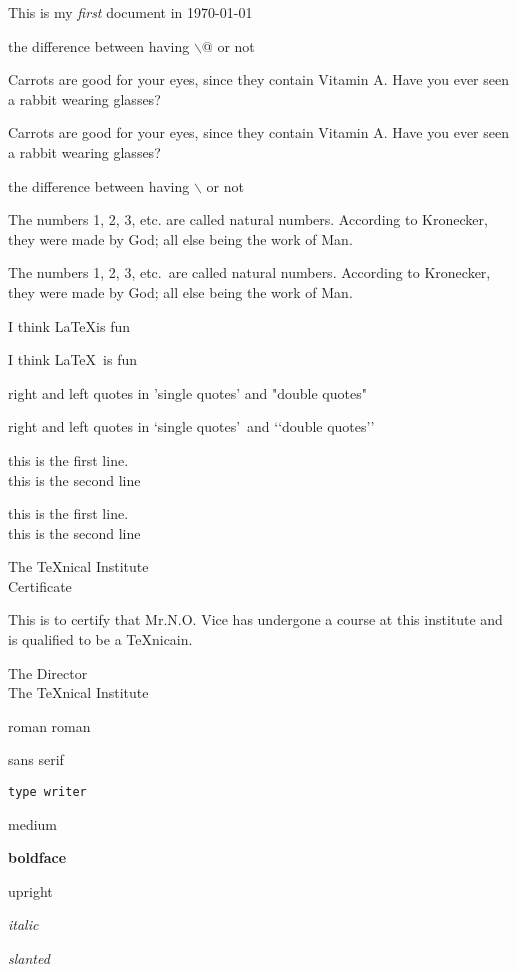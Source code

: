 \documentclass[a4paper, UTF8]{article}
\begin{document}
\noindent This is my \emph{first} document in \today

the difference between having $\backslash$@ or not

Carrots are good for your eyes, since they contain Vitamin A. Have you ever seen a rabbit wearing glasses?

Carrots are good for your eyes, since they contain Vitamin A\@. Have you ever seen a rabbit wearing glasses?

the difference between having $\backslash$ or not

The numbers 1, 2, 3, etc. are called natural numbers. According to Kronecker, they were made by God; all else being the work of Man.

The numbers 1, 2, 3, etc.\ are called natural numbers. According to Kronecker, they were made by God; all else being the work of Man.

I think \LaTeX is fun

I think \LaTeX\ is fun

right and left quotes in 'single quotes' and "double quotes"

right and left quotes in \lq single quotes\rq\ and \lq\lq double quotes\rq\rq

this is the first line.\\ this is the second line

this is the first line. \\[10pt] this is the second line

\begin{center}
    The \TeX nical Institute\\[0.75cm]
    Certificate
\end{center}
\noindent This is to certify that Mr.N.O. Vice has undergone a course at this institute and is qualified to be a \TeX nicain.
\begin{flushright}
    The Director\\
    The \TeX nical Institute
\end{flushright}

\textrm{roman}  {\rmfamily roman}

\textsf{sans serif}

\texttt{type writer}

\textmd{medium}

\textbf{boldface}

\textup{upright}

\textit{italic}

\textsl{slanted}
\end{document}
